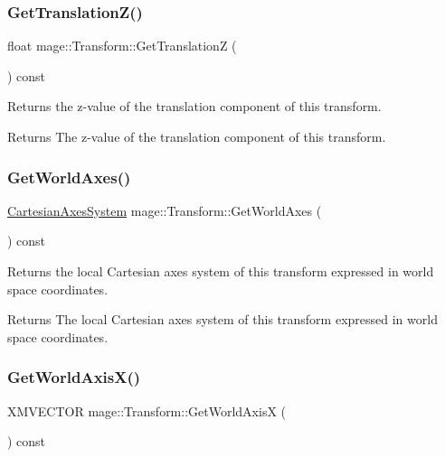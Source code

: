 \subsubsection{\texorpdfstring{Get\+Translation\+Z()}{GetTranslationZ()}}
{\footnotesize\ttfamily float mage\+::\+Transform\+::\+Get\+TranslationZ (\begin{DoxyParamCaption}{ }\end{DoxyParamCaption}) const}

Returns the z-\/value of the translation component of this transform.

\begin{DoxyReturn}{Returns}
The z-\/value of the translation component of this transform. 
\end{DoxyReturn}
\hypertarget{structmage_1_1_transform_a580a4f9fd987259da0cf0355ade7fb4b}{}\label{structmage_1_1_transform_a580a4f9fd987259da0cf0355ade7fb4b} 
\subsubsection{\texorpdfstring{Get\+World\+Axes()}{GetWorldAxes()}}
{\footnotesize\ttfamily \hyperlink{structmage_1_1_cartesian_axes_system}{Cartesian\+Axes\+System} mage\+::\+Transform\+::\+Get\+World\+Axes (\begin{DoxyParamCaption}{ }\end{DoxyParamCaption}) const}

Returns the local Cartesian axes system of this transform expressed in world space coordinates.

\begin{DoxyReturn}{Returns}
The local Cartesian axes system of this transform expressed in world space coordinates. 
\end{DoxyReturn}
\hypertarget{structmage_1_1_transform_ac7a718127c5212bb73d04302371473d0}{}\label{structmage_1_1_transform_ac7a718127c5212bb73d04302371473d0} 
\subsubsection{\texorpdfstring{Get\+World\+Axis\+X()}{GetWorldAxisX()}}
{\footnotesize\ttfamily X\+M\+V\+E\+C\+T\+OR mage\+::\+Transform\+::\+Get\+World\+AxisX (\begin{DoxyParamCaption}{ }\end{DoxyParamCaption}) const}

